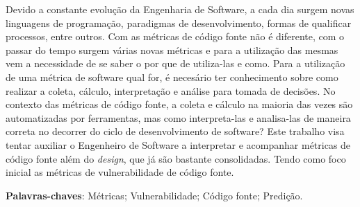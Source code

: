 \begin{resumo}

Devido a constante evolução da Engenharia de Software, a cada dia surgem 
novas linguagens de programação, paradigmas de desenvolvimento, formas de
qualificar processos, entre outros. Com as métricas de código fonte não 
é diferente, com o passar do tempo surgem várias novas métricas e para
a utilização das mesmas vem a necessidade de se saber o por que de 
utiliza-las e como. Para a utilização de uma métrica de software qual for,
é necesário ter conhecimento sobre como realizar a coleta, cálculo, 
interpretação e análise para tomada de decisões. No contexto das métricas de
código fonte, a coleta e cálculo na maioria das vezes são automatizadas por
ferramentas, mas como interpreta-las e analisa-las de maneira correta no
decorrer do ciclo de desenvolvimento de software? Este trabalho visa tentar
auxiliar o Engenheiro de Software a interpretar e acompanhar métricas de 
código fonte além do \textit{design}, que já são bastante consolidadas. Tendo
como foco inicial as métricas de vulnerabilidade de código fonte.

 \vspace{\onelineskip}
    
 \noindent
 \textbf{Palavras-chaves}: Métricas; Vulnerabilidade; Código fonte; Predição.
\end{resumo}
